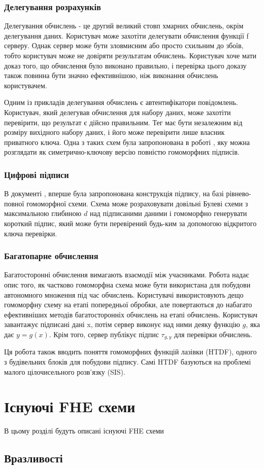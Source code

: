 \subsubsection*{Делегування розрахунків}
Делегування обчислень - це другий великий стовп хмарних обчислень, окрім делегування даних.
Користувач може захотіти делегувати обчислення функції f серверу. Однак сервер може бути
зловмисним або просто схильним до збоїв, тобто користувач може не довіряти результатам
обчислень. Користувач хоче мати доказ того, що обчислення було виконано правильно, і перевірка
цього доказу також повинна бути значно ефективнішою, ніж виконання обчислень користувачем.


Одним із прикладів делегування обчислень є автентифікатори повідомлень. Користувач, який
делегував обчислення для набору даних, може захотіти перевірити, що
результат є дійсно правильним. Тег має бути незалежним від розміру вихідного набору даних, і
його може перевірити лише власник приватного ключа. Одна з таких схем була запропонована в
роботі \cite{10.1007/978-3-642-42045-0_16}, яку можна розглядати як симетрично-ключову версію
повністю гомоморфних підписів.

\subsubsection*{Цифрові підписи}
В документі \cite{cryptoeprint:2014/897}, вперше була запропонована конструкція підпису, 
на базі рівнево-повної гомоморфної схеми. Схема може розраховувати довільні Булеві схеми з
максимальною глибиною \(d\) над підписаними даними і гомоморфно генерувати короткий підпис,
який може бути перевірений будь-ким за допомогою відкритого ключа перевірки. 

\subsubsection*{Багатопарне обчислення}

Багатосторонні обчислення вимагають взаємодії між учасниками. Робота 
\cite{cryptoeprint:2011/535} надає опис того, як частково гомоморфна схема може бути
використана для побудови автономного множення під час обчислень. Користувачі використовують
дещо гомоморфну схему на етапі попередньої обробки, але повертаються до набагато ефективніших
методів багатосторонніх обчислень на етапі обчислень. Користувач завантажує підписані дані x,
потім сервер виконує над ними деяку функцію \(g\), яка дає \(y = g(x)\). Крім того, сервер
публікує підпис \(\tau_{g,y}\) для перевірки обчислень.

Ця робота також вводить поняття гомоморфних функцій лазівки (HTDF), одного з будівельних
блоків для побудови підпису. Самі HTDF базуються на проблемі малого цілочисельного розв'язку (SIS).

\section{Існуючі FHE схеми}
В цьому розділі будуть описані існуючі FHE схеми

\subsection{Вразливості}


